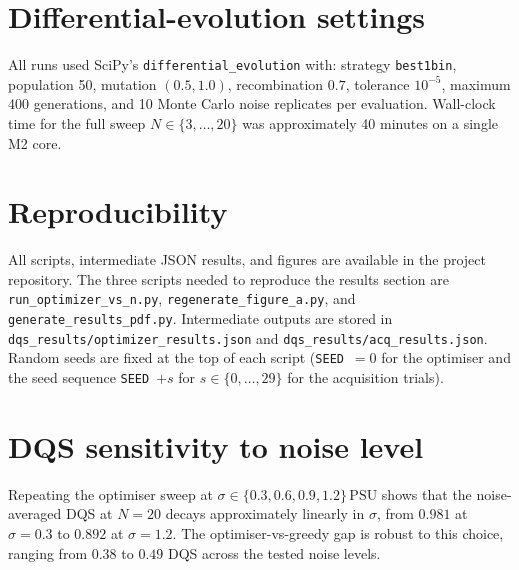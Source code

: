 \documentclass[11pt,letterpaper]{article}
\begin{document}
\section{Differential-evolution settings}
\label{app:de}
All runs used SciPy's \texttt{differential\_evolution} with: strategy
\texttt{best1bin}, population 50, mutation $(0.5,1.0)$, recombination
$0.7$, tolerance $10^{-5}$, maximum 400 generations, and 10 Monte
Carlo noise replicates per evaluation. Wall-clock time for the full
sweep $N\in\{3,\dots,20\}$ was approximately 40 minutes on a single
M2 core.

\section{Reproducibility}
\label{app:repro}
All scripts, intermediate JSON results, and figures are available in
the project repository. The three scripts needed to reproduce the
results section are \texttt{run\_optimizer\_vs\_n.py},
\texttt{regenerate\_figure\_a.py}, and
\texttt{generate\_results\_pdf.py}. Intermediate outputs are stored in
\texttt{dqs\_results/optimizer\_results.json} and
\texttt{dqs\_results/acq\_results.json}. Random seeds are fixed at the
top of each script (\texttt{SEED}~$=0$ for the optimiser and the seed
sequence \texttt{SEED}~$+s$ for $s\in\{0,\dots,29\}$ for the
acquisition trials).

\section{DQS sensitivity to noise level}
\label{app:noise}
Repeating the optimiser sweep at
$\sigma\in\{0.3,0.6,0.9,1.2\}\,\mathrm{PSU}$ shows that the
noise-averaged DQS at $N=20$ decays approximately linearly in
$\sigma$, from $0.981$ at $\sigma=0.3$ to $0.892$ at $\sigma=1.2$. The
optimiser-vs-greedy gap is robust to this choice, ranging from $0.38$
to $0.49$ DQS across the tested noise levels.
\end{document}

